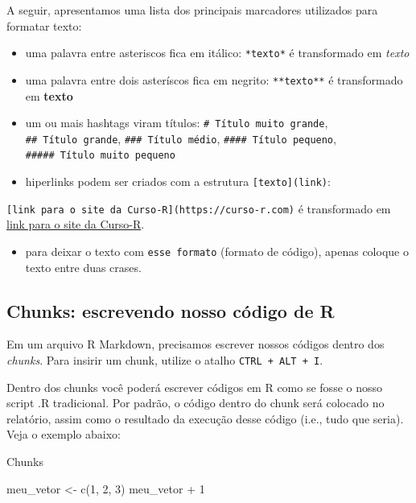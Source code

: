 \documentclass[
]{article}
\newenvironment{Shaded}{\begin{snugshade}}{\end{snugshade}}
\newcommand{\DecValTok}[1]{\textcolor[rgb]{0.00,0.00,0.81}{#1}}
\newcommand{\FunctionTok}[1]{\textcolor[rgb]{0.00,0.00,0.00}{#1}}
\newcommand{\NormalTok}[1]{#1}
\newcommand{\OtherTok}[1]{\textcolor[rgb]{0.56,0.35,0.01}{#1}}
\newcommand{\SpecialCharTok}[1]{\textcolor[rgb]{0.00,0.00,0.00}{#1}}
\providecommand{\tightlist}{%
  \setlength{\itemsep}{0pt}\setlength{\parskip}{0pt}}
\begin{document}
A seguir, apresentamos uma lista dos principais marcadores utilizados
para formatar texto:

\begin{itemize}
\item
  uma palavra entre asteriscos fica em itálico: \texttt{*texto*} é
  transformado em \emph{texto}
\item
  uma palavra entre dois asteríscos fica em negrito: \texttt{**texto**}
  é transformado em \textbf{texto}
\item
  um ou mais hashtags viram títulos: \texttt{\#\ Título\ muito\ grande},
  \texttt{\#\#\ Título\ grande}, \texttt{\#\#\#\ Título\ médio},
  \texttt{\#\#\#\#\ Título\ pequeno},
  \texttt{\#\#\#\#\#\ Título\ muito\ pequeno}
\item
  hiperlinks podem ser criados com a estrutura
  \texttt{{[}texto{]}(link)}:
\end{itemize}

\texttt{{[}link\ para\ o\ site\ da\ Curso-R{]}(https://curso-r.com)} é
transformado em \href{https://curso-r.com}{link para o site da Curso-R}.

\begin{itemize}
\tightlist
\item
  para deixar o texto com \texttt{esse\ formato} (formato de código),
  apenas coloque o texto entre duas crases.
\end{itemize}

\hypertarget{chunks-escrevendo-nosso-cuxf3digo-de-r}{%
\subsection{Chunks: escrevendo nosso código de
R}\label{chunks-escrevendo-nosso-cuxf3digo-de-r}}

Em um arquivo R Markdown, precisamos escrever nossos códigos dentro dos
\emph{chunks}. Para insirir um chunk, utilize o atalho
\texttt{CTRL\ +\ ALT\ +\ I}.

Dentro dos chunks você poderá escrever códigos em R como se fosse o
nosso script .R tradicional. Por padrão, o código dentro do chunk será
colocado no relatório, assim como o resultado da execução desse código
(i.e., tudo que seria). Veja o exemplo abaixo:

Chunks

\begin{Shaded}
\begin{Highlighting}[]
\NormalTok{meu\_vetor }\OtherTok{\textless{}{-}} \FunctionTok{c}\NormalTok{(}\DecValTok{1}\NormalTok{, }\DecValTok{2}\NormalTok{, }\DecValTok{3}\NormalTok{)}
\NormalTok{meu\_vetor }\SpecialCharTok{+} \DecValTok{1}
\end{Highlighting}
\end{Shaded}
\end{document}
